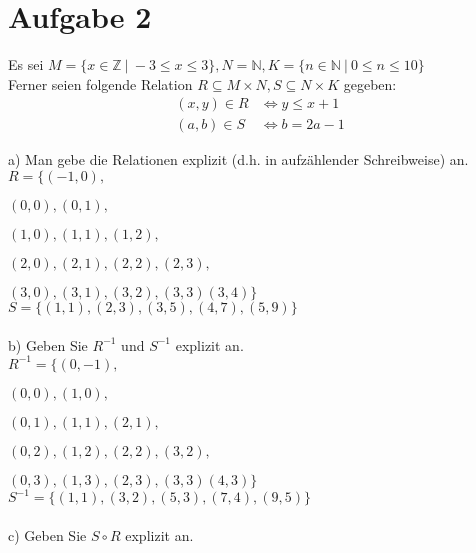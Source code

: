 \section*{Aufgabe 2}

Es sei $M = \{x \in \mathbb{Z} \ | \ -3 \leq x \leq 3\}, N = \mathbb{N}, K = \{n \in \mathbb{N} \ | \ 0 \leq n \leq 10\}$\\
Ferner seien folgende Relation $R \subseteq M \times N, S \subseteq N \times K$ gegeben:
\begin{align*}
(x,y) \in R &\Leftrightarrow y \leq x + 1\\
(a,b) \in S &\Leftrightarrow b = 2a -1
\end{align*}

a) Man gebe die Relationen explizit (d.h. in aufzählender Schreibweise) an.\\

$R = \{(-1,0),$

\hspace{1.1cm}$(0,0), (0,1),$

\hspace{1.1cm}$(1,0),(1,1), (1,2),$

\hspace{1.1cm}$(2,0), (2,1), (2,2), (2,3),$

\hspace{1.1cm}$(3,0), (3,1), (3,2), (3,3) (3,4)\}$\\

$S = \{(1,1), (2,3), (3,5), (4,7), (5,9)\}$\\~\\

b) Geben Sie $R^{-1}$ und $S^{-1}$ explizit an.\\

$R^{-1} = \{(0,-1),$

\hspace{1.5cm}$(0,0), (1,0),$

\hspace{1.5cm}$(0,1),(1,1), (2,1),$

\hspace{1.5cm}$(0,2), (1,2), (2,2), (3,2),$

\hspace{1.5cm}$(0,3), (1,3), (2,3), (3,3) (4,3)\}$\\

$S^{-1} = \{(1,1), (3,2), (5,3), (7,4), (9,5)\}$\\~\\

c) Geben Sie $S \circ R$ explizit an.\\

